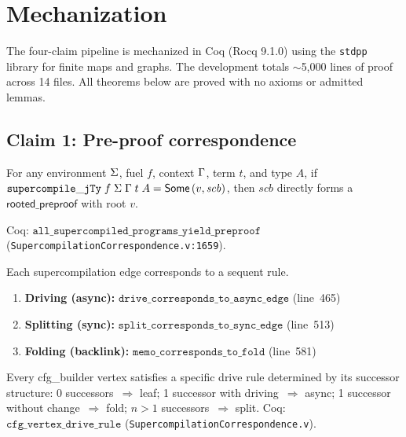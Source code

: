 \section{Mechanization}
\label{sec:mech}

The four-claim pipeline is mechanized in Coq (Rocq 9.1.0) using the \texttt{stdpp} library for finite maps and graphs.
The development totals $\sim$5,000 lines of proof across 14 files.
All theorems below are proved with no axioms or admitted lemmas.

\subsection{Claim 1: Pre-proof correspondence}

\begin{theorem}
\label{thm:mech-preproof}
For any environment $\Sigma$, fuel $f$, context $\Gamma$, term $t$, and type $A$, if
$\mathtt{supercompile\_jTy}\;f\;\Sigma\;\Gamma\;t\;A = \mathsf{Some}\,(v,\mathit{scb})$,
then $\mathit{scb}$ directly forms a $\mathsf{rooted\_preproof}$ with root $v$.
\end{theorem}

\noindent Coq: $\texttt{all\_supercompiled\_programs\_yield\_preproof}$ (\texttt{SupercompilationCorrespondence.v:1659}).

\begin{theorem}
\label{thm:mech-step}
Each supercompilation edge corresponds to a sequent rule.
\begin{enumerate}[leftmargin=*,nosep]
\item \textbf{Driving (async):} $\texttt{drive\_corresponds\_to\_async\_edge}$ (line~465)
\item \textbf{Splitting (sync):} $\texttt{split\_corresponds\_to\_sync\_edge}$ (line~513)
\item \textbf{Folding (backlink):} $\texttt{memo\_corresponds\_to\_fold}$ (line~581)
\end{enumerate}
\end{theorem}

\begin{proposition}
\label{thm:mech-vertex}
Every cfg\_builder vertex satisfies a specific drive rule determined by its successor structure: 0 successors~$\Rightarrow$ leaf; 1 successor with driving~$\Rightarrow$ async; 1 successor without change~$\Rightarrow$ fold; $n>1$ successors~$\Rightarrow$ split.
\newline Coq: $\texttt{cfg\_vertex\_drive\_rule}$ (\texttt{SupercompilationCorrespondence.v}).
\end{proposition}

